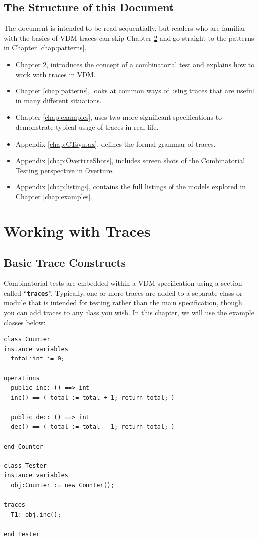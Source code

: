 \documentclass{overturerepchap}
\begin{document}
\section{The Structure of this Document}

The document is intended to be read sequentially, but readers who are familiar
with the basics of VDM traces can skip Chapter \ref{chap:traces} and go straight
to the patterns in Chapter \ref{chap:patterns}.

\begin{itemize}
\item Chapter \ref{chap:traces},  introduces the concept of
a combinatorial test and explains how to work with traces in VDM.
\item Chapter \ref{chap:patterns},  looks at common ways
of using traces that are useful in many different situations.
\item Chapter \ref{chap:examples},  uses two more
significant specifications to demonstrate typical usage of traces in real life.
\item Appendix \ref{chap:CTsyntax},  defines the formal
grammar of traces.
\item Appendix \ref{chap:OvertureShots},  includes
screen shots of the Combinatorial Testing perspective in Overture.
\item Appendix \ref{chap:listings},  contains the full
listings of the models explored in Chapter \ref{chap:examples}.
\end{itemize}

\chapter{Working with Traces}
\label{chap:traces}

\section{Basic Trace Constructs}
Combinatorial tests are embedded within a VDM specification using a section
called ``\texttt{\textbf{traces}}''. Typically, one or more traces are added to a separate class
or module that is intended for testing rather than the main specification,
though you can add traces to any class you wish. In this chapter, we will use
the example classes below:

\small
\begin{lstlisting}
class Counter
instance variables
  total:int := 0;

operations
  public inc: () ==> int
  inc() == ( total := total + 1; return total; )

  public dec: () ==> int
  dec() == ( total := total - 1; return total; )

end Counter

class Tester
instance variables
  obj:Counter := new Counter();

traces
  T1: obj.inc();

end Tester
\end{lstlisting}
\normalsize
\end{document}
